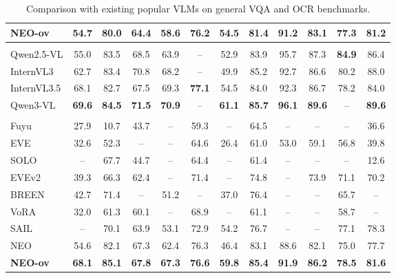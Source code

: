 \documentclass{llmxive}
\begin{document}
\begin{table}[t!]
{\begin{tabular}{lccccccccccc}
\rowcolor{gray!18} \textbf{NEO-ov} &\textbf{54.7} &\textbf{80.0} &\textbf{64.4} &\textbf{58.6} &\textbf{76.2} &\textbf{54.5} &\textbf{81.4} &\textbf{91.2} &\textbf{83.1}  &\textbf{77.3} &\textbf{81.2} \\

\midrule
\rowcolor{tablerowcolor1} \multicolumn{12}{l}{$\blacktriangledown$ \emph{Modular Vision-Language Models (Instruct-8B)}} \\

Qwen2.5-VL &55.0 &83.5 &68.5 &63.9 &-- &52.9 &83.9 &95.7 &87.3 &\textbf{84.9} &86.4 \\

InternVL3 &62.7 &83.4 &70.8 &68.2 &-- &49.9
&85.2 &92.7 &86.6 &80.2 &88.0 \\

InternVL3.5 &68.1 &82.7 &67.5 &69.3 &\textbf{77.1} &54.5 &84.0 &92.3 &86.7 &78.2 &84.0 \\

Qwen3-VL &\textbf{69.6} &\textbf{84.5} &\textbf{71.5} &\textbf{70.9} &-- &\textbf{61.1} &\textbf{85.7} &\textbf{96.1} &\textbf{89.6} &-- &\textbf{89.6} \\

\midrule

\rowcolor{tablerowcolor} \multicolumn{12}{l}{$\blacktriangledown$ \emph{Native Vision-Language Models (Instruct-8B)}} \\

Fuyu &27.9 & 10.7 & 43.7 & -- & 59.3 & --  & 64.5 & -- & -- & -- & 36.6 \\

EVE &32.6& 52.3 & -- & -- & 64.6 & 26.4 & 61.0 & 53.0 & 59.1 & 56.8 & 39.8 \\

SOLO &-- & 67.7 & 44.7 & -- & 64.4 & -- & 61.4 & -- & -- & -- & 12.6 \\

EVEv2 &39.3 & 66.3 &62.4 & -- & 71.4  & -- & 74.8 & -- & 73.9 & 71.1 & 70.2 \\

BREEN &42.7 & 71.4 & -- & 51.2 & -- & 37.0 & 76.4 & -- & -- & 65.7 & -- \\

VoRA &32.0 & 61.3 & 60.1 & -- & 68.9 & -- & 61.1 & -- & -- & 58.7 & -- \\

SAIL &-- & 70.1 & 63.9 & 53.1 & 72.9 & 54.2 & 76.7 & -- & --  & 77.1 & 78.3 \\

NEO &54.6 &82.1 &67.3 &62.4 &76.3 &46.4 &83.1 &88.6 &82.1 &75.0 &77.7 \\

\rowcolor{gray!18} 
\textbf{NEO-ov} &\textbf{68.1} &\textbf{85.1} &\textbf{67.8} &\textbf{67.3} &\textbf{76.6} &\textbf{59.8} &\textbf{85.4} &\textbf{91.9} &\textbf{86.2} &\textbf{78.5} &\textbf{81.6}\\
\bottomrule
\end{tabular}
}
\caption{Comparison with existing popular VLMs on general VQA and OCR benchmarks.}
\setlength\tabcolsep{2pt}
\label{tab:results_image}
\end{table}
\end{document}
